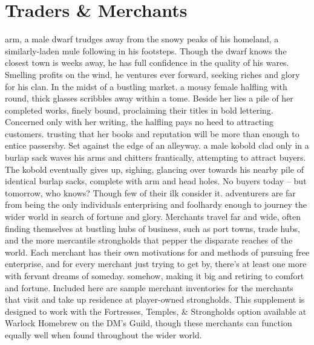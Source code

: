 \documentclass[10pt,a4paper,twoside,twocolumn,openany,nodeprecatedcode,bg=print]{dndbook}
\begin{document}
\tableofcontents
\newpage
\chapter{Traders \& Merchants}
 arm, a male dwarf trudges away from the snowy peaks of his homeland, a similarly-laden mule following in his footsteps. Though the dwarf knows the closest town is weeks away, he has full confidence in the quality of his wares. Smelling profits on the wind, he ventures ever forward, seeking riches and glory for his clan.
In the midst of a bustling market. a mousy female halfling with round, thick glasses scribbles away within a tome. Beside her lies a pile of her completed works, finely bound, proclaiming their titles in bold lettering. Concerned only with her writing, the halfling pays no heed to attracting customers. trusting that her books and reputation will be more than enough to entice passersby.
Set against the edge of an alleyway. a male kobold clad only in a burlap sack waves his arms and chitters frantically, attempting to attract buyers. The kobold eventually gives up, sighing, glancing over towards his nearby pile of identical burlap sacks, complete with arm and head holes. No buyers today -- but tomorrow, who knows?
Though few of their ilk consider it. adventurers are far from being the only individuals enterprising and foolhardy enough to journey the wider world in search of fortune and glory. Merchants travel far and wide, often finding themselves at bustling hubs of business, such as port towns, trade hubs, and the more mercantile strongholds that pepper the disparate reaches of the world. Each merchant has their own motivations for and methods of pursuing free enterprise, and for every merchant just trying to get by, there's at least one more with fervant dreams of someday. somehow, making it big and retiring to comfort and fortune.
Included here are sample merchant inventories for the merchants that visit and take up residence at player-owned strongholds. This supplement is designed to work with the Fortresses, Temples, \& Strongholds option available at Warlock Homebrew on the DM's Guild, though these merchants can function equally well when found throughout the wider world.
\end{document}
